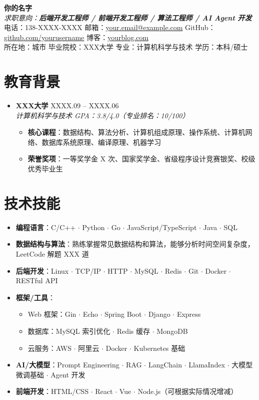 \documentclass[11pt,a4paper]{article}
\newcommand{\resumeItem}[1]{\item #1}
\newcommand{\resumeSubheading}[4]{
  \vspace{-2pt}
  \item
  \textbf{#1} \hfill #2 \\
  \textit{#3} \hfill #4
  \vspace{-5pt}
}
\begin{document}
\begin{center}
  \textbf{\Huge 你的名字} \\[6pt]
  \textit{求职意向：\textbf{后端开发工程师 / 前端开发工程师 / 算法工程师 / AI Agent 开发}} \\[6pt]
  电话：138-XXXX-XXXX \quad
  邮箱：\href{mailto:your.email@example.com}{your.email@example.com} \quad
  GitHub：\href{https://github.com/yourusername}{github.com/yourusername} \quad
  博客：\href{https://yourblog.com}{yourblog.com} \\[2pt]
  所在地：城市 \quad 毕业院校：XXX大学 \quad 专业：计算机科学与技术 \quad 学历：本科/硕士
\end{center}

\vspace{10pt}

\section{教育背景}

\begin{itemize}
  \resumeSubheading
    {XXX大学}{XXXX.09 -- XXXX.06}
    {计算机科学与技术 \quad GPA：3.8/4.0（专业排名：10/100）}{}
  \begin{itemize}
    \resumeItem{\textbf{核心课程}：数据结构、算法分析、计算机组成原理、操作系统、计算机网络、数据库系统原理、编译原理、机器学习}
    \resumeItem{\textbf{荣誉奖项}：一等奖学金 X 次、国家奖学金、省级程序设计竞赛银奖、校级优秀毕业生}
  \end{itemize}
\end{itemize}

\section{技术技能}

\begin{itemize}
  \item \textbf{编程语言}：C/C++ $\cdot$ Python $\cdot$ Go $\cdot$ JavaScript/TypeScript $\cdot$ Java $\cdot$ SQL
  \item \textbf{数据结构与算法}：熟练掌握常见数据结构和算法，能够分析时间空间复杂度，LeetCode 解题 XXX 道
  \item \textbf{后端开发}：Linux $\cdot$ TCP/IP $\cdot$ HTTP $\cdot$ MySQL $\cdot$ Redis $\cdot$ Git $\cdot$ Docker $\cdot$ RESTful API
  \item \textbf{框架/工具}：\begin{itemize}
    \item Web 框架：Gin $\cdot$ Echo $\cdot$ Spring Boot $\cdot$ Django $\cdot$ Express
    \item 数据库：MySQL 索引优化 $\cdot$ Redis 缓存 $\cdot$ MongoDB
    \item 云服务：AWS $\cdot$ 阿里云 $\cdot$ Docker $\cdot$ Kubernetes 基础
  \end{itemize}
  \item \textbf{AI/大模型}：Prompt Engineering $\cdot$ RAG $\cdot$ LangChain $\cdot$ LlamaIndex $\cdot$ 大模型微调基础 $\cdot$ Agent 开发
  \item \textbf{前端开发}：HTML/CSS $\cdot$ React $\cdot$ Vue $\cdot$ Node.js（可根据实际情况增减）
\end{itemize}
\end{document}
